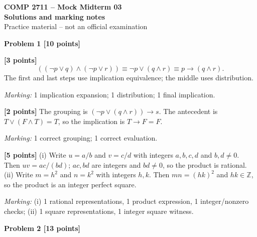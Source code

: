 \documentclass[12pt,letterpaper]{article}
\newcommand{\problemheading}[2][5\baselineskip]{\Needspace{#1}\par\noindent\hspace*{-0.625in}\textbf{#2}\par\nobreak\vspace{0.3em}}
\begin{document}
\begin{center}\textbf{COMP 2711 -- Mock Midterm 03}\\{\large\bfseries Solutions and marking notes}\\Practice material -- not an official examination\end{center}\vspace{0.5em}
\problemheading[\dimexpr 3\baselineskip+4\baselineskip\relax]{Problem 1 [10 points]}
\begin{description}[font=\normalfont,leftmargin=1.2em,labelsep=0.4em]
\item[(a)] \textbf{[3 points]} \[((\neg p\lor q)\land(\neg p\lor r))\equiv\neg p\lor(q\land r)\equiv p\to(q\land r).\] The first and last steps use implication equivalence; the middle uses distribution.
\par\textit{Marking:} 1 implication expansion; 1 distribution; 1 final implication.
\item[(b)] \textbf{[2 points]} The grouping is $(\neg p\lor(q\land r))\to s$. The antecedent is $T\lor(F\land T)=T$, so the implication is $T\to F=F$.
\par\textit{Marking:} 1 correct grouping; 1 correct evaluation.
\item[(c)] \textbf{[5 points]} (i) Write $u=a/b$ and $v=c/d$ with integers $a,b,c,d$ and $b,d\ne0$. Then $uv=ac/(bd)$; $ac,bd$ are integers and $bd\ne0$, so the product is rational. (ii) Write $m=h^2$ and $n=k^2$ with integers $h,k$. Then $mn=(hk)^2$ and $hk\in\mathbb Z$, so the product is an integer perfect square.
\par\textit{Marking:} (i) 1 rational representations, 1 product expression, 1 integer/nonzero checks; (ii) 1 square representations, 1 integer square witness.
\end{description}
\vspace{0.65em}
\problemheading[\dimexpr 3\baselineskip+4\baselineskip\relax]{Problem 2 [13 points]}
\end{document}
